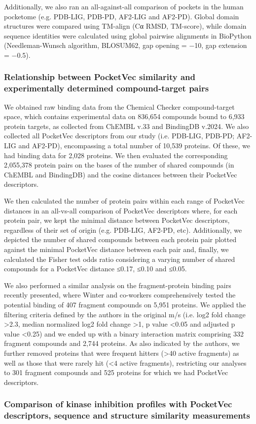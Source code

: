 Additionally, we also ran an all-against-all comparison of pockets in the human pocketome (e.g. PDB-LIG, PDB-PD, AF2-LIG and AF2-PD). Global domain structures were compared using TM-align\cite{zhang_tm-align_2005} (Cα RMSD, TM-score), while domain sequence identities were calculated using global pairwise alignments in BioPython\cite{cock_biopython_2009} (Needleman-Wunsch algorithm, BLOSUM62, gap opening = −10, gap extension = −0.5). 


\subsubsection{Relationship between PocketVec similarity and experimentally determined compound-target pairs}

We obtained raw binding data from the Chemical Checker compound-target space\cite{duran-frigola_extending_2020}, which contains experimental data on 836,654 compounds bound to 6,933 protein targets, as collected from ChEMBL v.33\cite{zdrazil_chembl_2024} and BindingDB v.2024\cite{gilson_bindingdb_2016}. We also collected all PocketVec descriptors from our study (i.e. PDB-LIG, PDB-PD; AF2-LIG and AF2-PD), encompassing a total number of 10,539 proteins. Of these, we had binding data for 2,028 proteins. We then evaluated the corresponding 2,055,378 protein pairs on the bases of the number of shared compounds (in ChEMBL and BindingDB) and the cosine distances between their PocketVec descriptors.

We then calculated the number of protein pairs within each range of PocketVec distances in an all-vs-all comparison of PocketVec descriptors where, for each protein pair, we kept the minimal distance between PocketVec descriptors, regardless of their set of origin (e.g. PDB-LIG, AF2-PD, etc). Additionally, we depicted the number of shared compounds between each protein pair plotted against the minimal PocketVec distance between each pair and, finally, we calculated the Fisher test odds ratio considering a varying number of shared compounds for a PocketVec distance ≤0.17, ≤0.10 and ≤0.05.

We also performed a similar analysis on the fragment-protein binding pairs recently presented\cite{offensperger_large-scale_2024}, where Winter and co-workers comprehensively tested the potential binding of 407 fragment compounds on 5,951 proteins. We applied the filtering criteria defined by the authors in the original m/s (i.e. log2 fold change >2.3, median normalized log2 fold change >1, p value <0.05 and adjusted p value <0.25) and we ended up with a binary interaction matrix comprising 332 fragment compounds and 2,744 proteins. As also indicated by the authors, we further removed proteins that were frequent hitters (>40 active fragments) as well as those that were rarely hit (<4 active fragments), restricting our analyses to 301 fragment compounds and 525 proteins for which we had PocketVec descriptors. 


\subsubsection{Comparison of kinase inhibition profiles with PocketVec descriptors, sequence and structure similarity measurements}